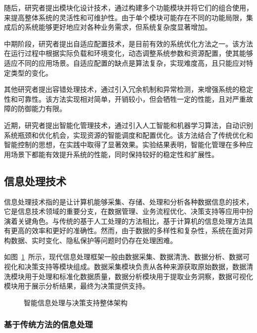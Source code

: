 随后，研究者提出模块化设计技术\cite{ref8}，通过构建多个功能模块并将它们的组合使用，来提高整体系统的灵活性和可维护性。由于单个模块可能存在不同的功能局限，集成后的系统能够更好地应对各种业务需求，但系统复杂度显著增加。

中期阶段，研究者提出自适应配置技术\cite{ref9}，是目前有效的系统优化方法之一。该方法在运行过程中根据实际负载和环境变化，动态调整系统参数和资源配置，使其能够适应不同的应用场景。自适应配置的缺点是算法复杂，实现难度高，且只能应对特定类型的变化。

其他研究者提出容错处理技术\cite{ref11}，通过引入冗余机制和异常检测，来增强系统的稳定性和可靠性。该方法实现相对简单，开销较小，但会牺牲一定的性能，且对严重故障的防御能力有限。

近期，研究者提出智能化管理技术\cite{ref13}，通过引入人工智能和机器学习算法，自动识别系统瓶颈和优化机会，实现资源的智能调度和配置优化。该方法结合了传统优化和智能控制的思想，在实践中取得了显著效果。实验结果表明，智能化管理在多种应用场景下都能有效提升系统的性能，同时保持较好的稳定性和扩展性。

\subsection{信息处理技术}\label{ziran-yuyu-chuli}

信息处理技术指的是让计算机能够采集、存储、处理和分析各种数据信息的技术，它是信息技术领域的重要分支，在数据管理、业务流程优化、决策支持等应用中扮演着关键角色。与传统的基于人工处理的方法相比，基于计算机的信息处理方法具有更高的效率和更好的准确性。然而，由于数据的多样性和复杂性，系统在面对异构数据、实时变化、隐私保护等问题时仍存在处理困难。

如图~\ref{fig:ch1-info-processing-arch}~所示，现代信息处理框架一般由数据采集、数据清洗、数据分析、数据可视化和决策支持等模块组成。数据采集模块负责从各种来源获取原始数据，数据清洗模块用于处理和标准化数据质量，数据分析模块用于提取业务洞察，数据可视化模块用于展示分析结果，最终为决策提供支持。

\begin{figure}[htbp]
\centering
{}
\caption{智能信息处理与决策支持整体架构}
\label{fig:ch1-info-processing-arch}
\end{figure}

\subsubsection{基于传统方法的信息处理}\label{subsec:intro-info-processing-traditional}

